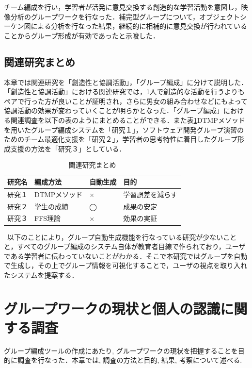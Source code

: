 \documentclass{funthesis}
\begin{document}
チーム編成を行い，学習者が活発に意見交換する創造的な学習活動を意図し，映像分析のグループワークを行なった．補完型グループについて，オブジェクトシーケン図による分析を行なった結果，継続的に相補的に意見交換が行われていることからグループ形成が有効であったと示唆した．



\section{関連研究まとめ}
本章では関連研究を「創造性と協調活動」，「グループ編成」に分けて説明した．「創造性と協調活動」における関連研究では，1人で創造的な活動を行うよりもペアで行った方が良いことが証明され，さらに男女の組み合わせなどにもよって協調活動の効果が変わっていくことが明らかとなった．「グループ編成」における関連調査を以下の表のようにまとめることができる．また表\ref{関連まとめ}DTMPメソッドを用いたグループ編成システムを「研究１」，ソフトウェア開発グループ演習のためのチーム最適化支援を「研究２」，学習者の思考特性に着目したグループ形成支援の方法を「研究３」としている．
\begin{table}[h]
\begin{center}
  \caption{関連研究まとめ}
  
  \begin{tabular}{llll} \hline
    研究名 & 編成方法 & 自動生成 & 目的\tabularnewline \hline
    研究１& DTMPメソッド & × & 学習誤差を減らす\tabularnewline
    研究２&学生の成績 &◯&成果の安定\tabularnewline
    研究３&FFS理論&× & 効果の実証\tabularnewline
     \hline
  \end{tabular}
  \label{関連まとめ}
  \end{center}
\end{table}



\ 以下のことにより，グループ自動生成機能を行なっている研究が少ないことと，すべてのグループ編成のシステム自体が教育者目線で作られており，ユーザである学習者に伝わっていないことがわかる．そこで本研究ではグループを自動で生成し，その上でグループ情報を可視化することで，ユーザの視点を取り入れたシステムを提案する．
\chapter{グループワークの現状と個人の認識に関する調査}

グループ編成ツールの作成にあたり,  グループワークの現状を把握することを目的に調査を行なった．本章では,  調査の方法と目的,  結果,  考察について述べる.
\end{document}
